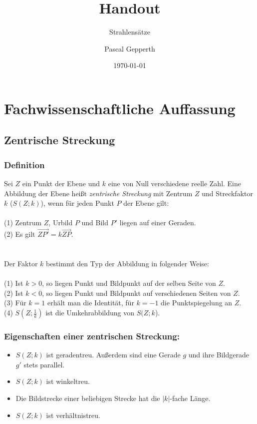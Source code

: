 \documentclass[a4paper,headlines=4, footlines=1]{scrartcl}
\title{Handout}
\subtitle{Strahlensätze}
\author{Pascal Gepperth}
\date{\today}
\begin{document}
\section{Fachwissenschaftliche Auffassung}
\subsection*{Zentrische Streckung}
\subsubsection*{Definition}
Sei $Z$ ein Punkt der Ebene und $k$ eine von Null verschiedene reelle Zahl. Eine Abbildung der Ebene heißt \textit{zentrische Streckung} mit Zentrum $Z$ und Streckfaktor $k$ ($S(Z;k)$), wenn für jeden Punkt $P$ der Ebene gilt:\\\\
(1) Zentrum $Z$, Urbild $P$ und Bild $P'$ liegen auf einer Geraden.\\
(2) Es gilt $ \stackrel{\longrightarrow}{ZP'}=k\stackrel{\longrightarrow}{ZP}$.\\\\\\
Der Faktor $k$ bestimmt den Typ der Abbildung in folgender Weise:\\\\
(1) Ist $k>0$, so liegen Punkt und Bildpunkt auf der selben Seite von $Z$.\\
(2) Ist $k<0$, so liegen Punkt und Bildpunkt auf verschiedenen Seiten von $Z$.\\
(3) Für $k=1$ erhält man die Identität, für $k=-1$ die Punktspiegelung an $Z$.\\
(4) $S(Z;\frac{1}{k})$ ist die Umkehrabbildung von $S(Z;k$).

\subsubsection*{Eigenschaften einer zentrischen Streckung:}
\begin{itemize}
	\item $S(Z;k)$ ist geradentreu. Außerdem sind eine Gerade $g$ und ihre Bildgerade $g'$ stets parallel.
	\item $S(Z;k)$ ist winkeltreu.
	\item Die Bildstrecke einer beliebigen Strecke hat die $|k|$-fache Länge.
	\item $S(Z;k)$ ist verhältnistreu.
\end{itemize}
\end{document}
